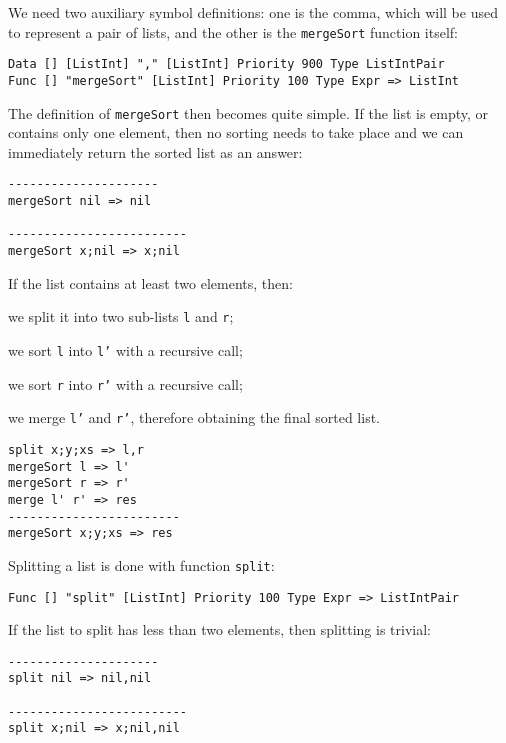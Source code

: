 We need two auxiliary symbol definitions: one is the comma, which will be used to represent a pair of lists, and the other is the \texttt{mergeSort} function itself:

\begin{lstlisting}
Data [] [ListInt] "," [ListInt] Priority 900 Type ListIntPair
Func [] "mergeSort" [ListInt] Priority 100 Type Expr => ListInt
\end{lstlisting}

The definition of \texttt{mergeSort} then becomes quite simple. If the list is empty, or contains only one element, then no sorting needs to take place and we can immediately return the sorted list as an answer:

\begin{lstlisting}
---------------------
mergeSort nil => nil

-------------------------
mergeSort x;nil => x;nil
\end{lstlisting}

If the list contains at least two elements, then:
\begin{inparaenum}
\item we split it into two sub-lists \texttt{l} and \texttt{r};
\item we sort \texttt{l} into \texttt{l'} with a recursive call;
\item we sort \texttt{r} into \texttt{r'} with a recursive call;
\item we merge \texttt{l'} and \texttt{r'}, therefore obtaining the final sorted list.
\end{inparaenum}

\begin{lstlisting}
split x;y;xs => l,r
mergeSort l => l'
mergeSort r => r'
merge l' r' => res
------------------------
mergeSort x;y;xs => res
\end{lstlisting}

Splitting a list is done with function \texttt{split}:

\begin{lstlisting}
Func [] "split" [ListInt] Priority 100 Type Expr => ListIntPair
\end{lstlisting}

If the list to split has less than two elements, then splitting is trivial:

\begin{lstlisting}
---------------------
split nil => nil,nil

-------------------------
split x;nil => x;nil,nil
\end{lstlisting}

